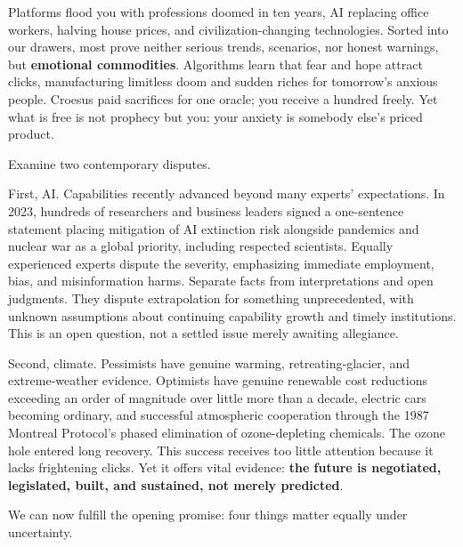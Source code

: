 Platforms flood you with professions doomed in ten years, AI replacing office workers, halving house prices, and civilization-changing technologies. Sorted into our drawers, most prove neither serious trends, scenarios, nor honest warnings, but \textbf{emotional commodities}. Algorithms learn that fear and hope attract clicks, manufacturing limitless doom and sudden riches for tomorrow's anxious people. Croesus paid sacrifices for one oracle; you receive a hundred freely. Yet what is free is not prophecy but you: your anxiety is somebody else's priced product.

Examine two contemporary disputes.

First, AI. Capabilities recently advanced beyond many experts' expectations. In 2023, hundreds of researchers and business leaders signed a one-sentence statement placing mitigation of AI extinction risk alongside pandemics and nuclear war as a global priority, including respected scientists. Equally experienced experts dispute the severity, emphasizing immediate employment, bias, and misinformation harms. Separate facts from interpretations and open judgments. They dispute extrapolation for something unprecedented, with unknown assumptions about continuing capability growth and timely institutions. This is an open question, not a settled issue merely awaiting allegiance.

Second, climate. Pessimists have genuine warming, retreating-glacier, and extreme-weather evidence. Optimists have genuine renewable cost reductions exceeding an order of magnitude over little more than a decade, electric cars becoming ordinary, and successful atmospheric cooperation through the 1987 Montreal Protocol's phased elimination of ozone-depleting chemicals. The ozone hole entered long recovery. This success receives too little attention because it lacks frightening clicks. Yet it offers vital evidence: \textbf{the future is negotiated, legislated, built, and sustained, not merely predicted}.

We can now fulfill the opening promise: four things matter equally under uncertainty.

